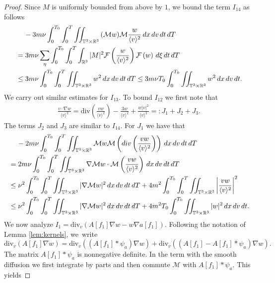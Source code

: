 \documentclass[10pt,a4paper]{amsart}
\newcommand{\CalM}{\mathcal{M}}
\newcommand{\R}{\mathbb R}
\newcommand{\T}{\mathbb{T}}
\newcommand{\dT}{\, {\rm d} T}
\newcommand{\dt}{\, {\rm d} t}
\newcommand{\dv}{\, {\rm d} v}
\newcommand{\dxi}{\, {\rm d} \xi}
\newcommand{\dx}{\, {\rm d} x}
\newcommand{\vpran}[1]{\left(#1\right)}
\begin{document}
\begin{proof}
Since ${M}$ is uniformly bounded from above by $1$, we bound the term ${ I_{14}}$ as follows 
\begin{align*} 
& \quad \,
-3m \nu \int_0^{T_0}\int_0^{T} \iint_{\T^3 \times \R^3} { ( {\CalM} w)  }  {\CalM} { \frac{ w }{\langle v \rangle ^2} } 
\dx\dv\dt\dT
\\
&=3m \nu  \sum_{\eta} \int_0^{T_0}\int_0^{T}\int_{\R^3}  |M|^2 \mathcal{F}\left({ \frac{ w }{\langle v \rangle ^2} }\right) \mathcal{F}\left(w\right) \dxi \dt\dT 
\\
&\le 
3m \nu\int_0^{T_0}\int_0^{T}  \iint_{\T^3 \times \R^3} w^2 \dx\dv\dt\dT 
\leq 
3m \nu T_0 \int_0^{T_0}\iint_{\T^3 \times \R^3} w^2 \dx\dv\dt. 
\end{align*}
We carry out similar estimates for ${I_{13}}$.  To bound ${I_{12}}$ we first note that  
\begin{align*}
\frac{v \cdot \nabla w }{\langle v \rangle ^2} = \textrm{div} \left(\frac{v  w }{\langle v \rangle ^2} \right) - \frac{3w}{\langle v \rangle ^2} +  \frac{w|v|^2 }{\langle v \rangle ^2} =: J_1+J_2+J_3.
\end{align*}
The terms $J_2$ and $J_3$ are similar to $I_{14}$. For $J_1$ we have that 
\begin{align*}
& \quad \,
-2m\nu \int_0^{T_0}\int_0^{T} \iint_{\T^3 \times \R^3}  \CalM w \CalM \left( \textrm{div} \left(\frac{v  w }{\langle v \rangle ^2} \right)\right) \dx\dv\dt\dT 
\\
& = 2m\nu \int_0^{T_0}\int_0^{T} \iint_{\T^3 \times \R^3} \nabla \CalM w \cdot \CalM \left(\frac{v  w }{\langle v \rangle ^2} \right)  \dx\dv\dt\dT 
\\
& \leq \nu^2  \int_0^{T_0}\int_0^{T} \iint_{\T^3 \times \R^3} |\nabla \CalM w|^2 \dx\dv\dt\dT 
+ 4m^2 \int_0^{T_0}\int_0^{T} \iint_{\T^3 \times \R^3}  \left|\frac{v  w }{\langle v \rangle ^2} \right|^2  %
\\
&\leq 
\nu^2  \int_0^{T_0}\int_0^{T} \iint_{\T^3 \times \R^3} |\nabla \CalM w|^2 \dx\dv\dt\dT 
+  4m^2 T_0 \int_0^{T_0} \iint_{\T^3 \times \R^3}  | w|^2  \dx\dv\dt.
\end{align*}
We now analyze $I_1=\textrm{div}_v \left( A[f_1] \nabla w - w \nabla a[f_1]\right)$.  Following the notation of Lemma \ref{lem:kernels}, we~write 
$$
\textrm{div}_v \left( A[f_1] \nabla w\right) = \textrm{div}_v \left( \vpran{A[f_1]\ast \psi_a} \nabla w\right) + \textrm{div}_v \left( (A[f_1]-A[f_1]\ast \psi_a )\nabla w\right).
$$
The matrix $ A[f_1]\ast \psi_a $ is nonnegative definite. In the term with the smooth diffusion we first integrate by parts and then commute $\mathcal{M}$ with $A[f_1]\ast \psi_a $. This yields  

\end{proof}
\end{document}
